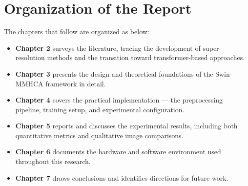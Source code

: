 \section{Organization of the Report}
The chapters that follow are organized as below:
\begin{itemize}
    \item \textbf{Chapter 2} surveys the literature, tracing the development of super-resolution methods and the transition toward transformer-based approaches.
    \item \textbf{Chapter 3} presents the design and theoretical foundations of the Swin-MMHCA framework in detail.
    \item \textbf{Chapter 4} covers the practical implementation — the preprocessing pipeline, training setup, and experimental configuration.
    \item \textbf{Chapter 5} reports and discusses the experimental results, including both quantitative metrics and qualitative image comparisons.
    \item \textbf{Chapter 6} documents the hardware and software environment used throughout this research.
    \item \textbf{Chapter 7} draws conclusions and identifies directions for future work.
\end{itemize}